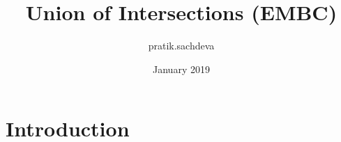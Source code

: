 \documentclass{article}
\title{Union of Intersections (EMBC)}
\author{pratik.sachdeva }
\date{January 2019}
\begin{document}
\maketitle

\section{Introduction}
\end{document}
